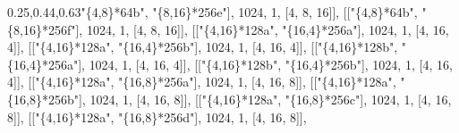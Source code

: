 \documentclass[
  10pt,
  letterpaper,
]{article}
\newenvironment{Shaded}{}{}
\newcommand{\FloatTok}[1]{\textcolor[rgb]{0.25,0.63,0.44}{#1}}
\newcommand{\NormalTok}[1]{#1}
\newcommand{\OperatorTok}[1]{\textcolor[rgb]{0.40,0.40,0.40}{#1}}
\newcommand{\StringTok}[1]{\textcolor[rgb]{0.25,0.44,0.63}{#1}}
\begin{document}
\begin{Shaded}
\begin{Highlighting}[]
\NormalTok{[[}\StringTok{"\{4,8\}*64b"}\OperatorTok{,} \StringTok{"\{8,16\}*256e"}\NormalTok{]}\OperatorTok{,} \FloatTok{1024}\OperatorTok{,} \FloatTok{1}\OperatorTok{,}\NormalTok{ [}\FloatTok{4}\OperatorTok{,} \FloatTok{8}\OperatorTok{,} \FloatTok{16}\NormalTok{]]}\OperatorTok{,}
\NormalTok{[[}\StringTok{"\{4,8\}*64b"}\OperatorTok{,} \StringTok{"\{8,16\}*256f"}\NormalTok{]}\OperatorTok{,} \FloatTok{1024}\OperatorTok{,} \FloatTok{1}\OperatorTok{,}\NormalTok{ [}\FloatTok{4}\OperatorTok{,} \FloatTok{8}\OperatorTok{,} \FloatTok{16}\NormalTok{]]}\OperatorTok{,}
\NormalTok{[[}\StringTok{"\{4,16\}*128a"}\OperatorTok{,} \StringTok{"\{16,4\}*256a"}\NormalTok{]}\OperatorTok{,} \FloatTok{1024}\OperatorTok{,} \FloatTok{1}\OperatorTok{,}\NormalTok{ [}\FloatTok{4}\OperatorTok{,} \FloatTok{16}\OperatorTok{,} \FloatTok{4}\NormalTok{]]}\OperatorTok{,}
\NormalTok{[[}\StringTok{"\{4,16\}*128a"}\OperatorTok{,} \StringTok{"\{16,4\}*256b"}\NormalTok{]}\OperatorTok{,} \FloatTok{1024}\OperatorTok{,} \FloatTok{1}\OperatorTok{,}\NormalTok{ [}\FloatTok{4}\OperatorTok{,} \FloatTok{16}\OperatorTok{,} \FloatTok{4}\NormalTok{]]}\OperatorTok{,}
\NormalTok{[[}\StringTok{"\{4,16\}*128b"}\OperatorTok{,} \StringTok{"\{16,4\}*256a"}\NormalTok{]}\OperatorTok{,} \FloatTok{1024}\OperatorTok{,} \FloatTok{1}\OperatorTok{,}\NormalTok{ [}\FloatTok{4}\OperatorTok{,} \FloatTok{16}\OperatorTok{,} \FloatTok{4}\NormalTok{]]}\OperatorTok{,}
\NormalTok{[[}\StringTok{"\{4,16\}*128b"}\OperatorTok{,} \StringTok{"\{16,4\}*256b"}\NormalTok{]}\OperatorTok{,} \FloatTok{1024}\OperatorTok{,} \FloatTok{1}\OperatorTok{,}\NormalTok{ [}\FloatTok{4}\OperatorTok{,} \FloatTok{16}\OperatorTok{,} \FloatTok{4}\NormalTok{]]}\OperatorTok{,}
\NormalTok{[[}\StringTok{"\{4,16\}*128a"}\OperatorTok{,} \StringTok{"\{16,8\}*256a"}\NormalTok{]}\OperatorTok{,} \FloatTok{1024}\OperatorTok{,} \FloatTok{1}\OperatorTok{,}\NormalTok{ [}\FloatTok{4}\OperatorTok{,} \FloatTok{16}\OperatorTok{,} \FloatTok{8}\NormalTok{]]}\OperatorTok{,}
\NormalTok{[[}\StringTok{"\{4,16\}*128a"}\OperatorTok{,} \StringTok{"\{16,8\}*256b"}\NormalTok{]}\OperatorTok{,} \FloatTok{1024}\OperatorTok{,} \FloatTok{1}\OperatorTok{,}\NormalTok{ [}\FloatTok{4}\OperatorTok{,} \FloatTok{16}\OperatorTok{,} \FloatTok{8}\NormalTok{]]}\OperatorTok{,}
\NormalTok{[[}\StringTok{"\{4,16\}*128a"}\OperatorTok{,} \StringTok{"\{16,8\}*256c"}\NormalTok{]}\OperatorTok{,} \FloatTok{1024}\OperatorTok{,} \FloatTok{1}\OperatorTok{,}\NormalTok{ [}\FloatTok{4}\OperatorTok{,} \FloatTok{16}\OperatorTok{,} \FloatTok{8}\NormalTok{]]}\OperatorTok{,}
\NormalTok{[[}\StringTok{"\{4,16\}*128a"}\OperatorTok{,} \StringTok{"\{16,8\}*256d"}\NormalTok{]}\OperatorTok{,} \FloatTok{1024}\OperatorTok{,} \FloatTok{1}\OperatorTok{,}\NormalTok{ [}\FloatTok{4}\OperatorTok{,} \FloatTok{16}\OperatorTok{,} \FloatTok{8}\NormalTok{]]}\OperatorTok{,}

\end{Highlighting}
\end{Shaded}
\end{document}
